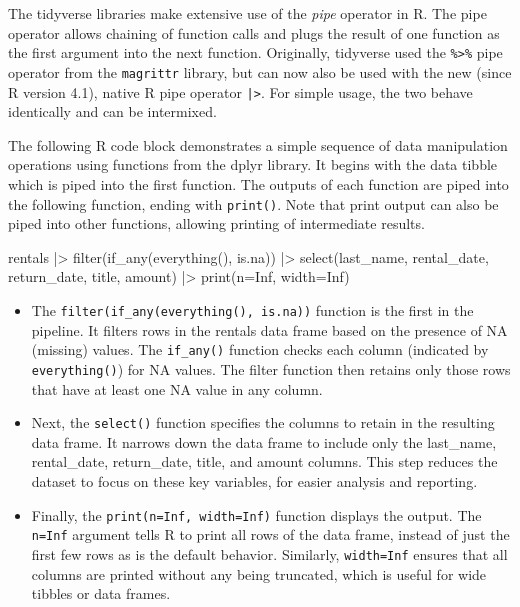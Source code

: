 The tidyverse libraries make extensive use of the \emph{pipe} operator in R. The pipe operator allows chaining of function calls and plugs the result of one function as the first argument into the next function. Originally, tidyverse used the \texttt{\%>\%} pipe operator from the \texttt{magrittr} library, but can now also be used with the new (since R version 4.1), native R pipe operator \texttt{|>}. For simple usage, the two behave identically and can be intermixed. 

The following R code block demonstrates a simple sequence of data manipulation operations using functions from the dplyr library. It begins with the data tibble which is piped into the first function. The outputs of each function are piped into the following function, ending with \texttt{print()}. Note that print output can also be piped into other functions, allowing printing of intermediate results. 

\begin{samepage}
\begin{Rcode}
rentals |> 
  filter(if_any(everything(), is.na)) |>
  select(last_name, rental_date, return_date, title, amount) |>
  print(n=Inf, width=Inf)
\end{Rcode}
\end{samepage}

\begin{itemize}
\item The \texttt{filter(if\_any(everything(), is.na))} function is the first in the pipeline. It filters rows in the rentals data frame based on the presence of NA (missing) values. The \texttt{if\_any()} function checks each column (indicated by \texttt{everything()}) for NA values. The filter function then retains only those rows that have at least one NA value in any column.

\item Next, the \texttt{select()} function specifies the columns to retain in the resulting data frame. It narrows down the data frame to include only the last\_name, rental\_date, return\_date, title, and amount columns. This step reduces the dataset to focus on these key variables, for easier analysis and reporting.

\item Finally, the \texttt{print(n=Inf, width=Inf)} function displays the output. The \texttt{n=Inf} argument tells R to print all rows of the data frame, instead of just the first few rows as is the default behavior. Similarly, \texttt{width=Inf} ensures that all columns are printed without any being truncated, which is useful for wide tibbles or data frames.
\end{itemize}

